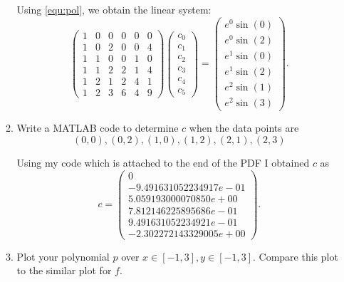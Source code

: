 \documentclass[a4paper,12pt]{article}
\newcommand{\pmat}[1]{\begin{pmatrix} #1 \end{pmatrix}}
\begin{document}
\begin{enumerate}[label = \arabic*)]
\begin{enumerate}[label = (\alph*)]
		Using \eqref{equ:pol}, we obtain the linear system:
		\[
			\pmat{
				1 & 0 & 0 & 0 & 0 & 0 \\
				1 & 0 & 2 & 0 & 0 & 4 \\
				1 & 1 & 0 & 0 & 1 & 0 \\
				1 & 1 & 2 & 2 & 1 & 4 \\
				1 & 2 & 1 & 2 & 4 & 1 \\
				1 & 2 & 3 & 6 & 4 & 9
			} \pmat{
				c_0 \\ c_1 \\ c_2 \\ c_3 \\ c_4 \\ c_5 
			} = \pmat{e^0 \sin(0) \\ e^0 \sin(2) \\ e^1 \sin(0) \\ e^1 \sin(2) \\ e^2 \sin(1) \\ e^2 \sin(3)}.
		\]
		
		\item Write a MATLAB code to determine $ c $ when the data points are
		\[
			(0,0), (0,2), (1,0), (1,2), (2,1), (2,3)
		\]
		
		Using my code which is attached to the end of the PDF I obtained $ c $ as 
		\[
			c =
			\pmat{
				0 \\
				-9.491631052234917e-01 \\
				5.059193000070850e+00 \\
				7.812146225895686e-01 \\
				9.491631052234921e-01 \\
				-2.302272143329005e+00
			}.
		\]
		
		\item Plot your polynomial $ p $ over $ x \in [-1,3], y \in [-1,3] $. Compare this plot to the similar plot for $ f $.
		

\end{enumerate}
\end{enumerate}
\end{document}
